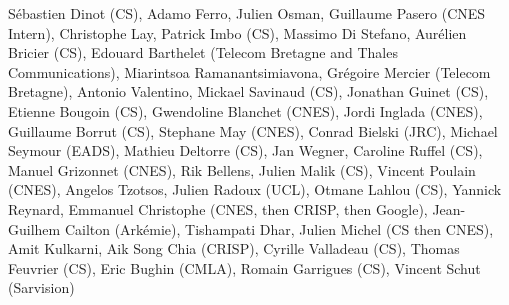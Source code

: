 S\'ebastien Dinot (CS), Adamo Ferro, Julien Osman, Guillaume Pasero (CNES Intern), Christophe Lay, Patrick Imbo (CS), Massimo Di Stefano, Aur\'elien Bricier (CS), Edouard Barthelet (Telecom Bretagne and Thales Communications), Miarintsoa Ramanantsimiavona, Gr\'egoire Mercier (Telecom Bretagne), Antonio Valentino, Mickael Savinaud (CS), Jonathan Guinet (CS), Etienne Bougoin (CS), Gwendoline Blanchet (CNES), Jordi Inglada (CNES), Guillaume Borrut (CS), Stephane May (CNES), Conrad Bielski (JRC), Michael Seymour (EADS), Mathieu Deltorre (CS), Jan Wegner, Caroline Ruffel (CS), Manuel Grizonnet (CNES), Rik Bellens, Julien Malik (CS), Vincent Poulain (CNES), Angelos Tzotsos, Julien Radoux (UCL), Otmane Lahlou (CS), Yannick Reynard, Emmanuel Christophe (CNES, then CRISP, then Google), Jean-Guilhem Cailton (Ark\'emie), Tishampati Dhar, Julien Michel (CS then CNES), Amit Kulkarni, Aik Song Chia (CRISP), Cyrille Valladeau (CS), Thomas Feuvrier (CS), Eric Bughin (CMLA), Romain Garrigues (CS), Vincent Schut (Sarvision)